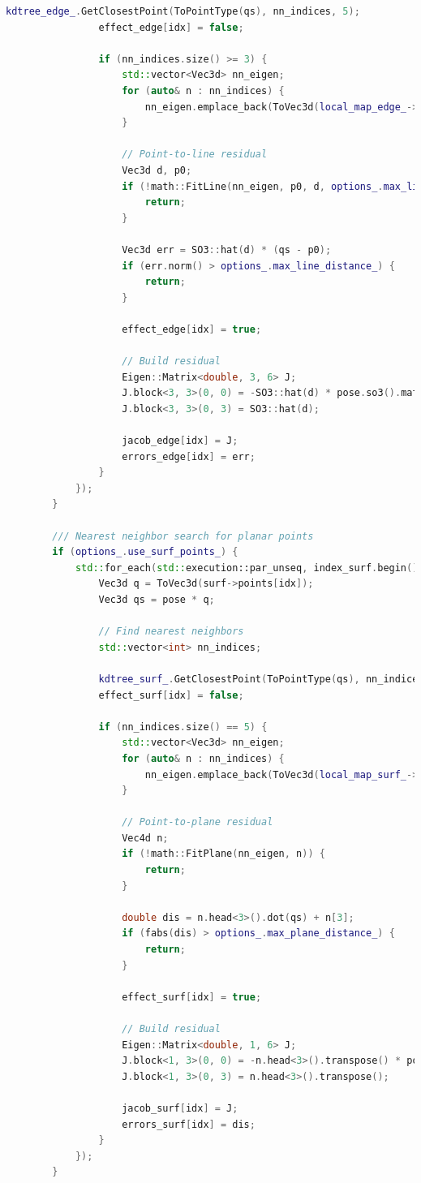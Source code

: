 \begin{lstlisting}[language=c++,caption=src/ch7/loam-like/loam\_like\_odom.cc]
				kdtree_edge_.GetClosestPoint(ToPointType(qs), nn_indices, 5);
				effect_edge[idx] = false;
				
				if (nn_indices.size() >= 3) {
					std::vector<Vec3d> nn_eigen;
					for (auto& n : nn_indices) {
						nn_eigen.emplace_back(ToVec3d(local_map_edge_->points[n]));
					}
					
					// Point-to-line residual
					Vec3d d, p0;
					if (!math::FitLine(nn_eigen, p0, d, options_.max_line_distance_)) {
						return;
					}
					
					Vec3d err = SO3::hat(d) * (qs - p0);
					if (err.norm() > options_.max_line_distance_) {
						return;
					}
					
					effect_edge[idx] = true;
					
					// Build residual
					Eigen::Matrix<double, 3, 6> J;
					J.block<3, 3>(0, 0) = -SO3::hat(d) * pose.so3().matrix() * SO3::hat(q);
					J.block<3, 3>(0, 3) = SO3::hat(d);
					
					jacob_edge[idx] = J;
					errors_edge[idx] = err;
				}
			});
		}
		
		/// Nearest neighbor search for planar points
		if (options_.use_surf_points_) {
			std::for_each(std::execution::par_unseq, index_surf.begin(), index_surf.end(), [&](int idx) {
				Vec3d q = ToVec3d(surf->points[idx]);
				Vec3d qs = pose * q;
				
				// Find nearest neighbors
				std::vector<int> nn_indices;
				
				kdtree_surf_.GetClosestPoint(ToPointType(qs), nn_indices, 5);
				effect_surf[idx] = false;
				
				if (nn_indices.size() == 5) {
					std::vector<Vec3d> nn_eigen;
					for (auto& n : nn_indices) {
						nn_eigen.emplace_back(ToVec3d(local_map_surf_->points[n]));
					}
					
					// Point-to-plane residual
					Vec4d n;
					if (!math::FitPlane(nn_eigen, n)) {
						return;
					}
					
					double dis = n.head<3>().dot(qs) + n[3];
					if (fabs(dis) > options_.max_plane_distance_) {
						return;
					}
					
					effect_surf[idx] = true;
					
					// Build residual
					Eigen::Matrix<double, 1, 6> J;
					J.block<1, 3>(0, 0) = -n.head<3>().transpose() * pose.so3().matrix() * SO3::hat(q);
					J.block<1, 3>(0, 3) = n.head<3>().transpose();
					
					jacob_surf[idx] = J;
					errors_surf[idx] = dis;
				}
			});
		}
		

\end{lstlisting}
